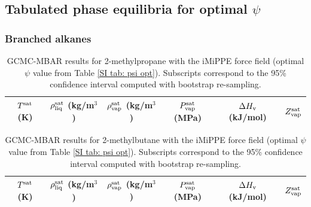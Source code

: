 \documentclass[journal=jctc,manuscript=article]{achemso}
\begin{document}
\subsection{Tabulated phase equilibria for optimal $\psi$}

\subsubsection{Branched alkanes}

\begin{table}[htb!]
	\caption{GCMC-MBAR results for 2-methylpropane with the iMiPPE force field (optimal $\psi$ value from Table \ref{SI tab: psi opt}). Subscripts correspond to the 95\% confidence interval computed with bootstrap re-sampling.}
	\begin{center}
		\begin{tabular}{|c|c|c|c|c|c|}
			\hline
			$T^{\rm sat}$ (K) & $\rho_{\rm liq}^{\rm sat}$ (kg/m$^3$) & $\rho_{\rm vap}^{\rm sat}$ (kg/m$^3$) & $P_{\rm vap}^{\rm sat}$ (MPa) & $\Delta H_{\rm v}$ (kJ/mol) & $Z_{\rm vap}^{\rm sat}$ \\ \hline
			\hline
		\end{tabular}
	\end{center}
\end{table}

\begin{table}[htb!]
	\caption{GCMC-MBAR results for 2-methylbutane with the iMiPPE force field (optimal $\psi$ value from Table \ref{SI tab: psi opt}). Subscripts correspond to the 95\% confidence interval computed with bootstrap re-sampling.}
	\begin{center}
		\begin{tabular}{|c|c|c|c|c|c|}
			\hline
			$T^{\rm sat}$ (K) & $\rho_{\rm liq}^{\rm sat}$ (kg/m$^3$) & $\rho_{\rm vap}^{\rm sat}$ (kg/m$^3$) & $P_{\rm vap}^{\rm sat}$ (MPa) & $\Delta H_{\rm v}$ (kJ/mol) & $Z_{\rm vap}^{\rm sat}$ \\ \hline
			\hline
		\end{tabular}
	\end{center}
\end{table}
\end{document}
